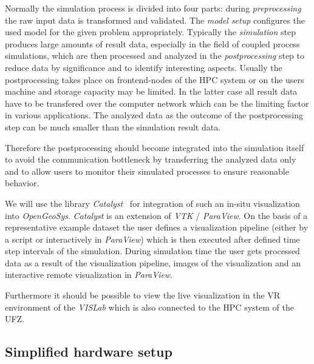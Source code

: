 \documentclass[twocolumn]{svjour3}          %
\begin{document}
Normally the simulation process is divided into four parts: during \emph{preprocessing} the raw input data is transformed and validated. The \emph{model setup} configures the used model for the given problem appropriately. Typically the \emph{simulation} step produces large amounts of result data, especially in the field of coupled process simulations, which are then processed and analyzed in the \emph{postprocessing} step to reduce data by significance and to identify interesting aspects. Usually the postprocessing takes place on frontend-nodes of the HPC system or on the users machine and storage capacity may be limited. In the latter case all result data have to be transfered over the computer network which can be the limiting factor in various applications. The analyzed data as the outcome of the postprocessing step can be much smaller than the simulation result data.

Therefore the postprocessing should become integrated into the simulation itself to avoid the communication bottleneck by transferring the analyzed data only and to allow users to monitor their simulated processes to ensure reasonable behavior.

We will use the library \emph{Catalyst}~\cite{web:catalyst} for integration of such an in-situ visualization into \emph{OpenGeoSys}. \emph{Catalyst} is an extension of \emph{VTK} / \emph{ParaView}. On the basis of a representative example dataset the user defines a visualization pipeline (either by a script or interactively in \emph{ParaView}) which is then executed after defined time step intervals of the simulation. During simulation time the user gets processed data as a result of the visualization pipeline, images of the visualization and an interactive remote visualization in \emph{ParaView}.

Furthermore it should be possible to view the live visualization in the VR environment of the \emph{VISLab} which is also connected to the HPC system of the UFZ.

\subsection{Simplified hardware setup}
\label{simplified-hardware-setup}
\end{document}
